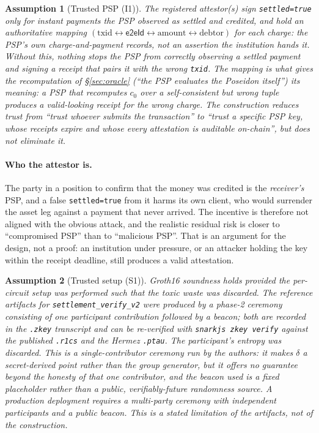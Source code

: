 \documentclass[11pt]{article}
\newtheorem*{assumption}{Assumption}
\newcommand{\eeid}{\ensuremath{\mathsf{e2eId}}}
\newcommand{\code}[1]{\texttt{#1}}
\begin{document}
\begin{assumption}[Trusted PSP (I1)]
The registered attestor(s) sign \code{settled=true} only for instant payments the
PSP observed as settled and credited, and hold an \emph{authoritative mapping}
$(\text{txid}\leftrightarrow\eeid\leftrightarrow\text{amount}\leftrightarrow
\text{debtor})$ for each charge: the PSP's own charge-and-payment records, not
an assertion the institution hands it. Without this, nothing stops the PSP from
correctly observing \emph{a} settled payment and signing a receipt that pairs it
with the wrong \code{txid}. The mapping is what gives the recomputation of
\S\ref{sec:oracle} (``the PSP evaluates the Poseidon itself'') its meaning: a
PSP that recomputes $c_0$ over a self-consistent but wrong tuple produces a
valid-looking receipt for the wrong charge. The construction reduces trust from
``trust whoever submits the transaction'' to ``trust a specific PSP key, whose
receipts expire and whose every attestation is auditable on-chain'', but does
not eliminate it.
\end{assumption}

\paragraph{Who the attestor is.}
The party in a position to confirm that the money was credited is the
\emph{receiver's} PSP, and a false \code{settled=true} from it harms its own
client, who would surrender the asset leg against a payment that never arrived.
The incentive is therefore not aligned with the obvious attack, and the
realistic residual risk is closer to ``compromised PSP'' than to ``malicious
PSP''. That is an argument for the design, not a proof: an institution under
pressure, or an attacker holding the key within the receipt deadline, still
produces a valid attestation.

\begin{assumption}[Trusted setup (S1)]
Groth16 soundness holds provided the per-circuit setup was performed such that
the toxic waste was discarded. The reference artifacts for
\code{settlement\_verify\_v2} were produced by a phase-2 ceremony consisting of
one participant contribution followed by a beacon; both are recorded in the
\code{.zkey} transcript and can be re-verified with \code{snarkjs zkey verify}
against the published \code{.r1cs} and the Hermez \code{.ptau}. The
participant's entropy was discarded. This is a \emph{single-contributor}
ceremony run by the authors: it makes $\delta$ a secret-derived point rather
than the group generator, but it offers no guarantee beyond the honesty of that
one contributor, and the beacon used is a fixed placeholder rather than a
public, verifiably-future randomness source. A production deployment requires a
multi-party ceremony with independent participants and a public beacon. This is
a stated limitation of the artifacts, not of the construction.
\end{assumption}
\end{document}
